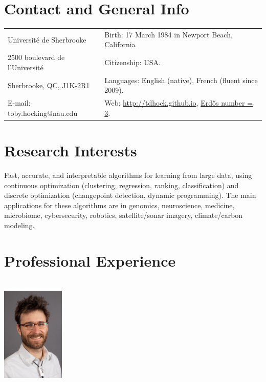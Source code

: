 \documentclass[margin,line]{res}
\begin{document}

\begin{resume}
\section{\sc Contact and General Info}
\vspace{.05in}
\begin{tabular*}{6.1in} {@{\extracolsep{\fill}}ll}
 Université de Sherbrooke & Birth: 17 March 1984 in Newport Beach, California\\
  2500 boulevard de l'Université  & Citizenship: USA. \\            
  Sherbrooke, QC, J1K-2R1 & Languages: English (native), French
                        (fluent since 2009). \\
  E-mail:  toby.hocking@nau.edu & Web: \url{http://tdhock.github.io}, \href{https://tdhock.github.io/blog/2022/erdos-number/}{Erd\H{o}s number = 3}. \\
\end{tabular*}

\section{\sc Research Interests}

Fast, accurate, and interpretable algorithms for learning from large
data, using continuous optimization (clustering, regression, ranking,
classification) and discrete optimization (changepoint detection,
dynamic programming). The main applications for these
algorithms are in genomics, neuroscience, medicine, microbiome,
cybersecurity, robotics, satellite/sonar imagery, climate/carbon
modeling.

\section{\sc Professional Experience \\ \hspace{0.1cm} \\ \includegraphics[width=3cm]{HOCKING-rectangle-lores.jpg}}


\end{resume}
\end{document}
